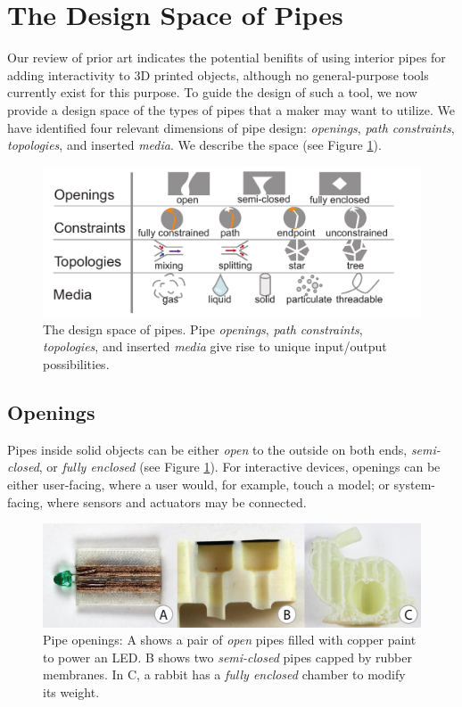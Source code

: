 
\section{The Design Space of Pipes}
Our review of prior art indicates the potential benifits of using interior pipes for adding interactivity to 3D printed objects, although no general-purpose tools currently exist for this purpose. To guide the design of such a tool, we now provide a design space of the types of pipes that a maker may want to utilize. We have identified four relevant dimensions of pipe design: \emph{openings}, \emph{path constraints}, \emph{topologies}, and inserted \emph{media}.  We describe the space (see Figure \ref{fig:pipespace}).

\begin{figure}[t]
\centering
    \includegraphics[width=1.0\columnwidth]{figures/tubespace.pdf}
\caption{The design space of pipes.  Pipe \emph{openings}, \emph{path constraints}, \emph{topologies}, and inserted \emph{media} give rise to unique input/output possibilities.}
\label{fig:pipespace}
\end{figure}

\subsection{Openings}
Pipes inside solid objects can be either \emph{open} to the outside on both ends, \emph{semi-closed}, or \emph{fully enclosed} (see Figure \ref{fig:pipespace}). For interactive devices, openings can be either user-facing, where a user would, for example, touch a model; or system-facing, where sensors and actuators may be connected.

\begin{figure}[t]
\centering
    \includegraphics[width=1.0\columnwidth]{figures/types.png}
\caption{Pipe openings: A shows a pair of \emph{open} pipes filled with copper paint to power an LED.  B shows two \emph{semi-closed} pipes capped by rubber membranes.  In C, a rabbit has a \emph{fully enclosed} chamber to modify its weight.}
\label{fig:openings}
\end{figure}

